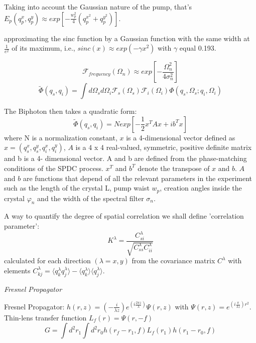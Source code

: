 Taking into account the Gaussian nature of the pump, that's $E_p(q^x_p , q^y_p ) \approx exp \left[ -\frac{w_p^2}{4}(q^{x^2}_p + q^{y^2}_p )\right]$.

approximating the sinc function by a Gaussian function with the same width at $\frac{1}{e^2}$ of its maximum, i.e., $sinc(x)\approx exp(- \gamma x^2)$  with $\gamma$ equal 0.193. 

\begin{equation}
\mathcal{F}_{frequency}(\Omega_n) \approx exp \left[-\frac{ \Omega^2_n}{4 \sigma^2_n} \right] 
\end{equation}
\begin{equation}
\tilde{\Phi}(q_s,q_i)=\int d\Omega_s d\Omega_i \mathcal{F}_s (\Omega_s) \mathcal{F}_i (\Omega_i) \Phi(q_s,\Omega_s;q_i,\Omega_i)
\end{equation}

The Biphoton then takes a quadratic form:
\begin{equation}\label{eq:quadratic}
\tilde{\Phi}(q_s,q_i)=N exp\left[ -\frac{1}{2}x^T A x + i b^T x \right]
\end{equation}
where N is a normalization constant, $x$ is a 4-dimensional vector defined as $x = (q^x_s, q^y_s ,q^x_i,q^y_i )$, $A$ is a 4 x 4 real-valued, symmetric, positive definite matrix and b is a 4- dimensional vector. A and b are defined from the phase-matching conditions of the SPDC process. $x^T$ and $b^T$ denote the transpose of $x$ and $b$. $A$ and $b$ are functions that depend of all the relevant parameters in the experiment such as the length of the crystal L, pump waist $w_p$, creation angles inside the crystal $\varphi_n$ and the width of the spectral filter $\sigma_n$.

A way to quantify the degree of spatial correlation we shall define 'correlation parameter':
\begin{equation}
K^\lambda = \frac{C^\lambda_{si}}{\sqrt{C^\lambda_{ss}C^\lambda_{ii}}}
\end{equation}
calculated for each direction $(\lambda = x, y)$ from the covariance matrix $C^\lambda$ with elements $C^\lambda_{kj} = \langle q^\lambda_k q^\lambda_j \rangle - \langle q^\lambda_k \rangle \langle q^\lambda_j \rangle $.


\textit{Fresnel Propagator}


Fresnel Propagator: $h(r,z)=(- \frac{i}{\lambda z})e^{(i \frac{2 \pi z}{\lambda})} \Psi (r,z)$ 
with $\Psi(r,z) = e^{(i \frac{\pi}{\lambda z })r^2}$. Thin-lens transfer function $L_f (r)=\Psi(r,-f)$
 \\
\begin{equation}\label{eq:green}
G= \int d^2 r_1 \int d^2 r_0 h(r_f - r_1,f) L_f(r_1) h(r_1 - r_0,f)
\end{equation}

